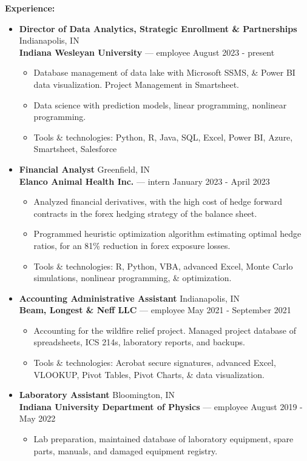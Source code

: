 \documentclass[letterpaper]{cream_class}
\begin{document}
\noindent\textcolor{burgundy}{\noindent\textbf{\large Experience:}\\[-3ex]}
\begin{itemize}[noitemsep, leftmargin=*]
  \item {\large\textbf{Director of Data Analytics, Strategic Enrollment \& Partnerships}} \hfill Indianapolis, IN \\
        \textbf{Indiana Wesleyan University} — employee \hfill August 2023 - present
    \begin{itemize}[noitemsep, leftmargin=*]
      \item Database management of data lake with Microsoft SSMS, \& Power BI data visualization. Project Management in Smartsheet.
      \item Data science with prediction models, linear programming, nonlinear programming.
      \item Tools \& technologies: Python, R, Java, SQL, Excel, Power BI, Azure, Smartsheet, Salesforce
    \end{itemize}    
  \item {\large\textbf{Financial Analyst}} \hfill Greenfield, IN \\
        \textbf{Elanco Animal Health Inc.} — intern \hfill January 2023 - April 2023
    \begin{itemize}[noitemsep, leftmargin=*]
      \item Analyzed financial derivatives, with the high cost of hedge forward contracts in the forex hedging strategy of the balance sheet.
      \item Programmed heuristic optimization algorithm estimating optimal hedge ratios, for an 81\% reduction in forex exposure losses.
      \item Tools \& technologies: R, Python, VBA, advanced Excel, Monte Carlo simulations, nonlinear programming, \& optimization.
    \end{itemize}        
  \item {\large\textbf{Accounting Administrative Assistant}} \hfill Indianapolis, IN \\
            \textbf{Beam, Longest \& Neff LLC} — employee \hfill May 2021 - September 2021
    \begin{itemize}[noitemsep, leftmargin=*]
      \item Accounting for the wildfire relief project. Managed project database of spreadsheets, ICS 214s, laboratory reports, and backups.
      \item Tools \& technologies: Acrobat secure signatures, advanced Excel, VLOOKUP, Pivot Tables, Pivot Charts, \& data visualization.
    \end{itemize}    
  \item {\large\textbf{Laboratory Assistant}} \hfill Bloomington, IN \\
        \textbf{Indiana University Department of Physics} — employee \hfill August 2019 - May 2022
    \begin{itemize}[noitemsep, leftmargin=*]
      \item Lab preparation, maintained database of laboratory equipment, spare parts, manuals, and damaged equipment registry.
    \end{itemize}
\end{itemize}
\end{document}
